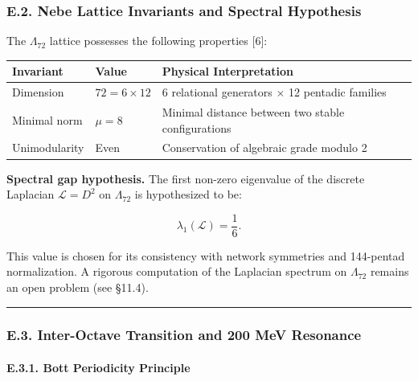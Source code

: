 \documentclass[11pt]{article}
\let\oldmathcal\mathcal
\renewcommand{\mathcal}[1]{\oldmathcal{#1}}
\begin{document}
\hypertarget{e.2.-nebe-lattice-invariants-and-spectral-hypothesis}{%
\subsubsection{E.2. Nebe Lattice Invariants and Spectral
Hypothesis}\label{e.2.-nebe-lattice-invariants-and-spectral-hypothesis}}

The \(\Lambda_{72}\) lattice possesses the following properties {[}6{]}:

\begin{table}[H]
\centering
\begin{tabular}{@{}lll@{}}
\toprule
Invariant & Value & Physical Interpretation \\
\midrule
Dimension & $72 = 6 \times 12$ & 6 relational generators $\times$ 12 pentadic families \\
Minimal norm & $\mu = 8$ & Minimal distance between two stable configurations \\
Unimodularity & Even & Conservation of algebraic grade modulo 2 \\
\bottomrule
\end{tabular}
\end{table}

\textbf{Spectral gap hypothesis.} The first non-zero eigenvalue of the
discrete Laplacian \(\mathcal{L} = D^2\) on \(\Lambda_{72}\) is
hypothesized to be:

\[
\lambda_1(\mathcal{L}) = \frac{1}{6}.
\]

This value is chosen for its consistency with network symmetries and
144-pentad normalization. A rigorous computation of the Laplacian
spectrum on \(\Lambda_{72}\) remains an open problem (see §11.4).

\begin{center}\rule{0.5\linewidth}{0.5pt}\end{center}

\hypertarget{e.3.-inter-octave-transition-and-200-mev-resonance}{%
\subsubsection{E.3. Inter-Octave Transition and 200 MeV
Resonance}\label{e.3.-inter-octave-transition-and-200-mev-resonance}}

\hypertarget{e.3.1.-bott-periodicity-principle}{%
\paragraph{E.3.1. Bott Periodicity
Principle}\label{e.3.1.-bott-periodicity-principle}}
\end{document}
